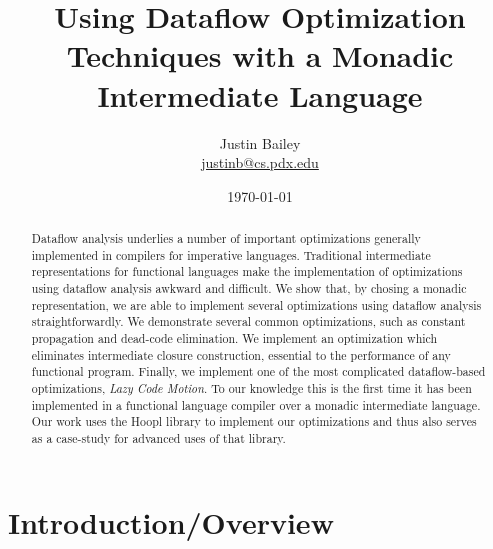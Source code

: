 \documentclass[11pt]{article}
\title{Using Dataflow Optimization Techniques with a Monadic Intermediate Language}
\author{Justin Bailey \\ \url{justinb@cs.pdx.edu}}
\date{\today}
\begin{document}
\VerbatimFootnotes
\DefineShortVerb{\#}
\doublespacing

\maketitle

\begin{abstract}
  Dataflow analysis underlies a number of important optimizations
  generally implemented in compilers for imperative
  languages. Traditional intermediate representations for functional
  languages make the implementation of optimizations using dataflow
  analysis awkward and difficult. We show that, by chosing a monadic
  representation, we are able to implement several optimizations using
  dataflow analysis straightforwardly. We demonstrate several common
  optimizations, such as constant propagation and dead-code
  elimination. We implement an optimization which eliminates
  intermediate closure construction, essential to the performance of
  any functional program. Finally, we implement one of the most
  complicated dataflow-based optimizations, \emph{Lazy Code
    Motion}. To our knowledge this is the first time it has been
  implemented in a functional language compiler over a monadic
  intermediate language. Our work uses the Hoopl library to implement
  our optimizations and thus also serves as a case-study
  for advanced uses of that library.
\end{abstract}

\begin{comment}
  This thesis describes a monadic intermediate language and how we used
  the Hoopl library to implement optimizations for programs written in
  it. We show that our monadic language makes it simpler to implement
  optimizations, such as Lazy Code Motion, not normally applied to
  functional languages. We also demonstrate an optimization that can
  eliminate many intra- and inter-procedure closure allocations and
  several optimizations based on the \emph{monad laws}.
\end{comment}


\section{Introduction/Overview}
\end{document}
